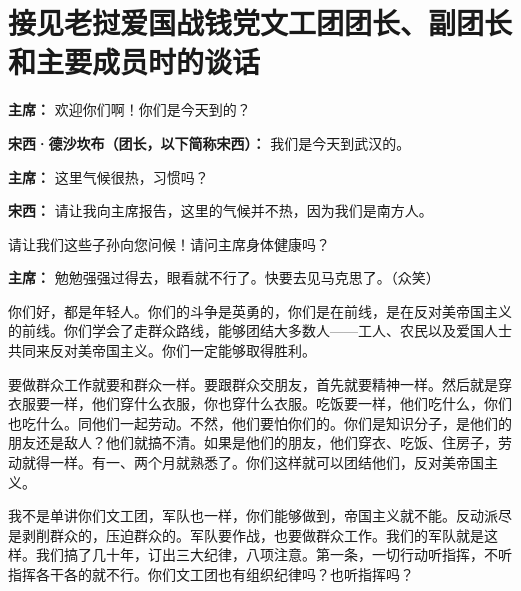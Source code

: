 \section[接见老挝爱国战钱党文工团团长、副团长和主要成员时的谈话（一九六四年九月四日武汉）]{接见老挝爱国战钱党文工团团长、副团长和主要成员时的谈话}

\begin{list}{}{
    \setlength{\topsep}{0pt}        %
    \setlength{\partopsep}{0pt}     %
    \setlength{\parsep}{\parskip}   %
    \setlength{\itemsep}{\lineskip}       %
    \setlength{\labelsep}{0pt}%
    \setlength{\labelwidth}{3em}%
    \setlength{\itemindent}{0pt}%
    \setlength\listparindent{\parindent}
    \setlength{\leftmargin}{3em}
    \setlength{\rightmargin}{0pt}
    }

\item[\textbf{主席：}] 欢迎你们啊！你们是今天到的？

\item[\textbf{宋西·德沙坎布（团长，以下简称宋西）：}] 我们是今天到武汉的。

\item[\textbf{主席：}] 这里气候很热，习惯吗？

\item[\textbf{宋西：}] 请让我向主席报告，这里的气候并不热，因为我们是南方人。

请让我们这些子孙向您问候！请问主席身体健康吗？ 

\item[\textbf{主席：}] 勉勉强强过得去，眼看就不行了。快要去见马克思了。（众笑）

你们好，都是年轻人。你们的斗争是英勇的，你们是在前线，是在反对美帝国主义的前线。你们学会了走群众路线，能够团结大多数人——工人、农民以及爱国人士共同来反对美帝国主义。你们一定能够取得胜利。

要做群众工作就要和群众一样。要跟群众交朋友，首先就要精神一样。然后就是穿衣服要一样，他们穿什么衣服，你也穿什么衣服。吃饭要一样，他们吃什么，你们也吃什么。同他们一起劳动。不然，他们要怕你们的。你们是知识分子，是他们的朋友还是敌人？他们就搞不清。如果是他们的朋友，他们穿衣、吃饭、住房子，劳动就得一样。有一、两个月就熟悉了。你们这样就可以团结他们，反对美帝国主义。

我不是单讲你们文工团，军队也一样，你们能够做到，帝国主义就不能。反动派尽是剥削群众的，压迫群众的。军队要作战，也要做群众工作。我们的军队就是这样。我们搞了几十年，订出三大纪律，八项注意。第一条，一切行动听指挥，不听指挥各干各的就不行。你们文工团也有组织纪律吗？也听指挥吗？


\end{list}
